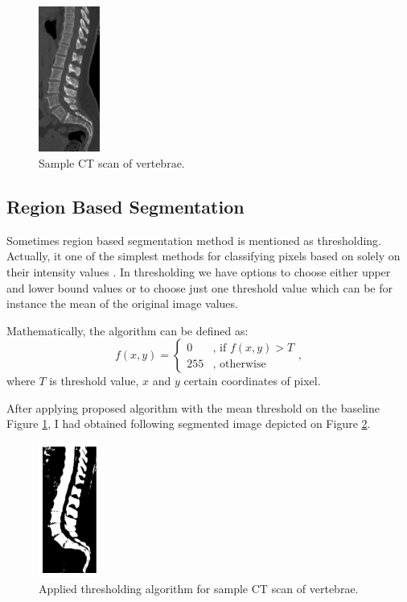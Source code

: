 \begin{figure}[h]
    \centering
    \includegraphics[width=2cm]{images/sample_vertebrae.jpeg}
    \caption{Sample CT scan of vertebrae.}
    \label{fig:sample_vertebrae}
\end{figure}


\subsection{Region Based Segmentation}
Sometimes region based segmentation method is mentioned as thresholding. Actually, it one of the simplest methods for classifying pixels based on solely on their intensity values \cite{Butchiraju2019}. In thresholding we have options to choose either upper and lower bound values or to choose just one threshold value which can be for instance the mean of the original image values. 

Mathematically, the algorithm can be defined as:
\[
    f(x, y)= 
\begin{cases}
    0 & \text{, if } f(x, y) > T \\
    255 & \text{, otherwise}
\end{cases}
,\]
where $T$ is threshold value, $x$ and $y$ certain coordinates of pixel.

After applying proposed algorithm with the mean threshold on the baseline Figure \ref{fig:sample_vertebrae}, I had obtained following segmented image depicted on Figure \ref{fig:sample_vertebrae_thresholding}. 

\begin{figure}[h]
    \centering
    \includegraphics[width=2cm]{images/sample_vertebrae_thresholding.png}
    \caption{Applied thresholding algorithm for sample CT scan of vertebrae.}
    \label{fig:sample_vertebrae_thresholding}
\end{figure}


